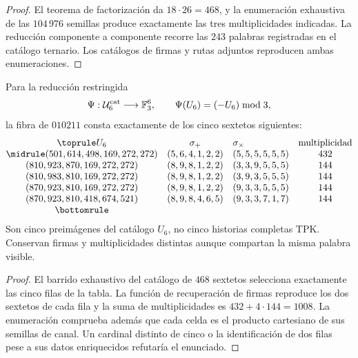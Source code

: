 \begin{proof}
El teorema de factorización da \(18\cdot26=468\), y la enumeración
exhaustiva de las \(104\,976\) semillas produce exactamente las tres
multiplicidades indicadas. La reducción componente a componente recorre las
\(243\) palabras registradas en el catálogo ternario. Los catálogos de
firmas y rutas adjuntos reproducen ambas enumeraciones.
\end{proof}

\begin{proposition}
\label{pf84:E02-22}
Para la reducción restringida
\[
 \Psi:\mathcal U_6^{\rm cat}\longrightarrow\mathbb F_3^6,
 \qquad \Psi(U_6)=(-U_6)\bmod3,
\]
la fibra de \(010211\) consta exactamente de los cinco sextetos siguientes:
\begingroup
\scriptsize
\[
\begin{array}{@{}cclc@{}}
\toprule
U_6&\sigma_+&\sigma_\times&\text{multiplicidad}\\
\midrule
(501,614,498,169,272,272)&(5,6,4,1,2,2)&(5,5,5,5,5,5)&432\\
(810,923,870,169,272,272)&(8,9,8,1,2,2)&(3,3,9,5,5,5)&144\\
(810,983,810,169,272,272)&(8,9,8,1,2,2)&(3,9,3,5,5,5)&144\\
(870,923,810,169,272,272)&(8,9,8,1,2,2)&(9,3,3,5,5,5)&144\\
(870,923,810,418,674,521)&(8,9,8,4,6,5)&(9,3,3,7,1,7)&144\\
\bottomrule
\end{array}
\]
\endgroup
Son cinco preimágenes del catálogo \(U_6\), no cinco historias completas
TPK. Conservan firmas y multiplicidades distintas aunque compartan la misma
palabra visible.
\end{proposition}

\begin{proof}
El barrido exhaustivo del catálogo de \(468\) sextetos selecciona exactamente
las cinco filas de la tabla. La función de recuperación de firmas reproduce
los dos sextetos de cada fila y la suma de multiplicidades es
\(432+4\cdot144=1008\). La enumeración comprueba además que cada celda es el
producto cartesiano de sus semillas de canal. Un cardinal distinto de cinco
o la identificación de dos filas pese a sus datos enriquecidos refutaría el
enunciado.
\end{proof}
